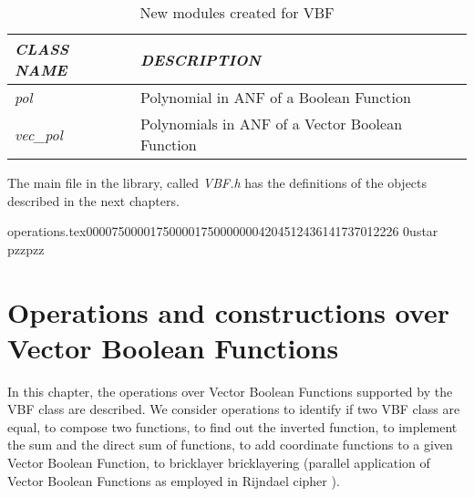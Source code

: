 \begin{table}[htbp]%
\caption{New modules created for VBF\label{tab:NewModules}}{%
\begin{tabular}{|l|l|}
\hline
\em{CLASS NAME} & \em{DESCRIPTION} \\\hline
\textsl{pol} & Polynomial in ANF of a Boolean Function \\\hline
\textsl{vec\_pol} & Polynomials in ANF of a Vector Boolean Function \\\hline
\end{tabular}}
\end{table}%

The main file in the library, called \textsl{VBF.h} has the definitions
of the objects described in the next chapters.



                                                                                                                                                                                                                                                                                                                                                                                                                                                                                                                           operations.tex                                                                                      0000750 0001750 0001750 00000042045 12436141737 012226  0                                                                                                    ustar   pzz                             pzz                                                                                                                                                                                                                    
\chapter{Operations and constructions over Vector Boolean Functions}

In this chapter, the operations over Vector Boolean Functions supported by the VBF
class are described.  We consider operations to identify if two VBF class are equal, to compose two functions, to find out the inverted function, to implement the sum and the direct sum of functions, to add coordinate functions to a given Vector Boolean Function, to bricklayer bricklayering (parallel application of Vector Boolean Functions as employed in Rijndael cipher \cite{DaemenR:02}).

